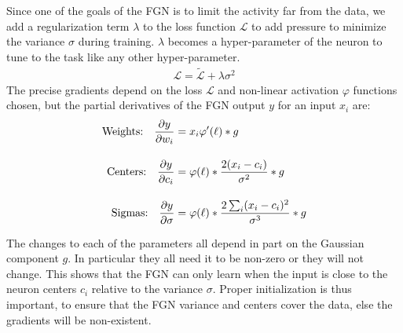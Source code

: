\documentclass[12pt,oneside]{CUNY_PhD}
\begin{document}
Since one of the goals of the FGN is to limit the activity far from the data, we add a regularization term $\lambda$ to the loss function $\mathcal{L} $ to add pressure to minimize the variance $\sigma$ during training. $\lambda$ becomes a hyper-parameter of the neuron to tune to the task like any other hyper-parameter.
\begin{align}
\mathcal{L}  = \tilde{\mathcal{L} } + \lambda\sigma^2
\end{align}
The precise gradients depend on the loss $\mathcal{L}$ and non-linear activation $\varphi$ functions chosen, but the partial derivatives of the FGN output $y$ for an input $x_i$  are:
\begin{align}
    \text{Weights:\quad} \frac{\partial y}{\partial w_i} &=  x_i \varphi'(\ell) * g  \\[1em]
    \text{Centers:\quad} \frac{\partial y}{\partial c_i} &= \varphi(\ell) * \frac{2(x_i-c_i)}{\sigma^2} * g \\[1em]
    \text{Sigmas:\quad} \frac{\partial y}{\partial \sigma} &= \varphi(\ell) * \frac{2\sum_{i}(x_i-c_i)^2}{\sigma^3}* g
\end{align}

The changes to each of the parameters all depend in part on the Gaussian component $g$. In particular they all need it to be non-zero or they will not change. This shows that the FGN can only learn when the input is close to the neuron centers $c_i$ relative to the variance $\sigma$. Proper initialization is thus important, to ensure that the FGN variance and centers cover the data, else the gradients will be non-existent.
\end{document}
